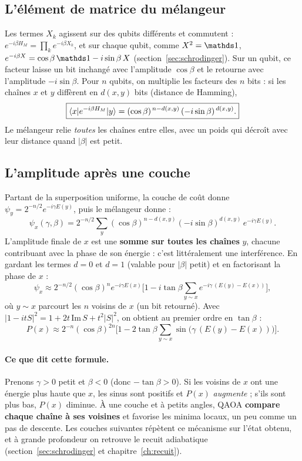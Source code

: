 \subsection{L'élément de matrice du mélangeur}
Les termes $X_k$ agissent sur des qubits différents et commutent : $e^{-i\beta H_M}=\prod_ke^{-i\beta X_k}$, et sur chaque qubit, comme $X^2=\Id$, $e^{-i\beta X}=\cos\beta\,\Id-i\sin\beta\,X$ (section~\ref{sec:schrodinger}). Sur un qubit, ce facteur laisse un bit inchangé avec l'amplitude $\cos\beta$ et le retourne avec l'amplitude $-i\sin\beta$. Pour $n$ qubits, on multiplie les facteurs des $n$ bits : si les chaînes $x$ et $y$ diffèrent en $d(x,y)$ bits (distance de Hamming),
\[ \boxed{\langle x\rvert e^{-i\beta H_M}\lvert y\rangle=(\cos\beta)^{\,n-d(x,y)}\,(-i\sin\beta)^{\,d(x,y)}.} \]
Le mélangeur relie \emph{toutes} les chaînes entre elles, avec un poids qui décroît avec leur distance quand $|\beta|$ est petit.

\subsection{L'amplitude après une couche}
Partant de la superposition uniforme, la couche de coût donne $\psi_y=2^{-n/2}e^{-i\gamma E(y)}$, puis le mélangeur donne :
\[ \psi_x(\gamma,\beta)=2^{-n/2}\sum_y(\cos\beta)^{n-d(x,y)}(-i\sin\beta)^{d(x,y)}\,e^{-i\gamma E(y)}. \]
L'amplitude finale de $x$ est une \textbf{somme sur toutes les chaînes} $y$, chacune contribuant avec la phase de son énergie : c'est littéralement une interférence. En gardant les termes $d=0$ et $d=1$ (valable pour $|\beta|$ petit) et en factorisant la phase de $x$ :
\[ \psi_x\approx2^{-n/2}(\cos\beta)^ne^{-i\gamma E(x)}\Big[1-i\tan\beta\sum_{y\sim x}e^{-i\gamma\,(E(y)-E(x))}\Big], \]
où $y\sim x$ parcourt les $n$ voisins de $x$ (un bit retourné). Avec $|1-itS|^2=1+2t\,\mathrm{Im}\,S+t^2|S|^2$, on obtient au premier ordre en $\tan\beta$ :
\[ P(x)\approx2^{-n}(\cos\beta)^{2n}\Big[1-2\tan\beta\sum_{y\sim x}\sin\big(\gamma\,(E(y)-E(x))\big)\Big]. \]

\paragraph{Ce que dit cette formule.} Prenons $\gamma>0$ petit et $\beta<0$ (donc $-\tan\beta>0$). Si les voisins de $x$ ont une énergie plus haute que $x$, les sinus sont positifs et $P(x)$ \emph{augmente} ; s'ils sont plus bas, $P(x)$ diminue. À une couche et à petits angles, QAOA \textbf{compare chaque chaîne à ses voisines} et favorise les minima locaux, un peu comme un pas de descente. Les couches suivantes répètent ce mécanisme sur l'état obtenu, et à grande profondeur on retrouve le recuit adiabatique (section~\ref{sec:schrodinger} et chapitre~\ref{ch:recuit}).


